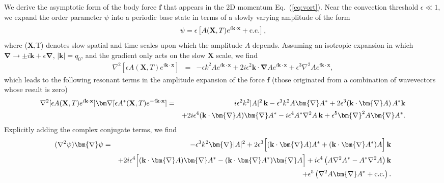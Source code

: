 \documentclass[preprint,prx,floatfix]{revtex4-1}
\begin{document}
We derive the asymptotic form of the body force $\mathbf{f}$ that appears in the 2D momentum Eq.~(\ref{eq:vort}). Near the convection threshold $\epsilon \ll 1$, we expand the order parameter $\psi$ into a periodic base state in terms of a slowly varying amplitude of the form
\begin{equation}
 \psi = \epsilon \left[ A(\mathbf{X},T) e^{i\mathbf{k}\cdot\mathbf{x}} + {\rm c.c.}\right ],
\label{eq:expansion}
\end{equation}
where ($\mathbf{X}$,T) denotes slow spatial and time scales upon which the amplitude $A$ depends. Assuming an isotropic expansion in which ${\bm \nabla} \rightarrow  \pm i \mathbf{k} + \epsilon \bm{\nabla}$, $| \mathbf{k} | = q_{0}$, and the gradient only acts on the slow $\mathbf{X}$ scale, we find
\begin{eqnarray*}
\nabla^{2} \left[ \epsilon A(\mathbf{X},T) e^{i \mathbf{k} \cdot\mathbf{x}} \right] &=& - \epsilon k^{2} A e^{i \mathbf{k} \cdot\mathbf{x}} + 2i \epsilon^{2} \mathbf{k}\cdot{\bm \nabla} A e^{i\mathbf{k} \cdot\mathbf{x}} + \epsilon^3 \nabla^2 A e^{i\mathbf{k} \cdot\mathbf{x}},
\end{eqnarray*}
which leads to the following resonant terms in the amplitude expansion of the force $\mathbf{f}$ (those originated from a combination of wavevectors whose result is zero)
\begin{eqnarray*}
\nabla^{2} [\epsilon A(\mathbf{X},T) e^{i \mathbf{k} \cdot\mathbf{x}} ] {\bm \nabla} [\epsilon A^*(\mathbf{X},T) e^{-i \mathbf{k} \cdot\mathbf{x}} ] & = & i \epsilon^{2}k^{2} |A|^{2}\,{\bf k} - \epsilon^{3}k^{2} A\bm{\nabla} A^{*} + 2\epsilon^3({\bf k}\cdot\bm{\nabla} A) \, A^*{\bf k} 
\\
&&+ 2i \epsilon^{4} ({\bf k} \cdot \bm{\nabla} A) \bm{\nabla} A^{*} - i \epsilon^{4}  A^{*} \nabla^{2} A \, {\bf k} + \epsilon^{5} \bm{\nabla}^{2}A \bm{\nabla} A^{*}.
\end{eqnarray*}
Explicitly adding the complex conjugate terms, we find
\begin{eqnarray*}
  (\nabla^{2} \psi ) \bm{\nabla} \psi
  &=&
      - \epsilon^{3}k^{2} \bm{\nabla} |A|^{2}
      + 2\epsilon^3\Big[({\bf k}\cdot \bm{\nabla} A)A^*+({\bf k}\cdot \bm{\nabla} A^*)A\Big]\,{\bf k}
  \\
  &&
      + 2 i \epsilon^4\Big[({\bf k}\cdot \bm{\nabla} A)\bm{\nabla} A^*-({\bf k}\cdot \bm{\nabla} A^*)\bm{\nabla} A\Big]
     + i \epsilon^{4} \left( A \nabla^{2} A^{*} - A^{*} \nabla^{2} A \right) {\bf k}
  \\
  &&
      + \epsilon^{5} \left( \nabla^{2}A \bm{\nabla} A^{*} + {\rm c.c.} \right).
\end{eqnarray*}
\end{document}
